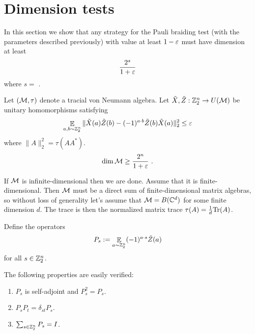 \section{Dimension tests}
\label{sec:dim-test}

In this section we show that any strategy for the Pauli braiding test (with the parameters described previously) with value at least $1 - \varepsilon$ must have dimension at least
\[
	\frac{2^s}{1 + \varepsilon}
\]
where $s = $ .


\begin{theorem}
Let $(\mathcal{M},\tau)$ denote a tracial von Neumann algebra. 
Let $\tilde{X},\tilde{Z}: \mathbb{Z}_2^n \to U(\mathcal{M})$ be unitary homomorphisms satisfying
\[
\mathop{\mathbb{E}}\displaylimits_{a,b \sim \mathbb{Z}_2^n} \| \tilde{X}(a) \tilde{Z}(b) - (-1)^{a \cdot b} \tilde{Z}(b) \tilde{X}(a) \|_2^2 \leq \varepsilon
\]
where $\| A \|_2^2 = \tau(AA^*)$. 
    \[
    \dim \mathcal{M} \geq \frac{2^n}{1 + \varepsilon}~.
    \]
\end{theorem}

If $\mathcal{M}$ is infinite-dimensional then we are done. Assume that it is finite-dimensional. Then $\mathcal{M}$ must be a direct sum of finite-dimensional matrix algebras, so without loss of generality let's assume that $\mathcal{M} = B(\mathbb{C}^d)$ for some finite dimension $d$. The trace is then the normalized matrix trace $\tau(A) = \frac{1}{d} \mbox{\rm Tr}(A)$. 

Define the operators
\[
P_s := \mathop{\mathbb{E}}\displaylimits_{a \sim \mathbb{Z}_2^n} (-1)^{a \cdot s} \tilde{Z}(a)
\]
for all $s \in \mathbb{Z}_2^n$. 

The following properties are easily verified:
\begin{enumerate}
    \item $P_s$ is self-adjoint and $P_s^2 = P_s$.
    \item $P_s P_t = \delta_{st} P_s$.
    \item $\sum_{s \in \mathbb{Z}_2^n} P_s = I$.
\end{enumerate}

